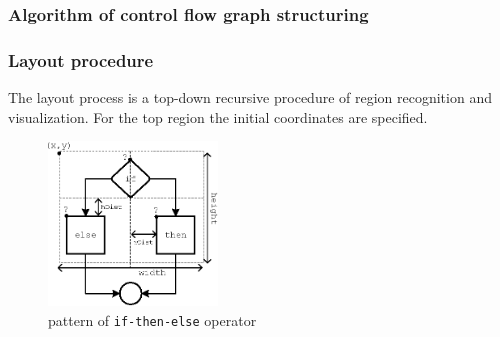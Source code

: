 \documentclass{beamer}
\begin{document}

\begin{frame}
\frametitle{Algorithm of control flow graph structuring}
\small{%
\begin{algorithm}[H]
\SetAlgoLined %
\end{algorithm}%
}
\end{frame}


\begin{frame}
\frametitle{Layout procedure}

The layout process is a top-down recursive procedure of region recognition and visualization.  For the top region the initial coordinates are specified.

\begin{figure}[htbp]
	\centering
		\includegraphics[width=0.4\textwidth]{Pic/IfThenElse.eps}
	\caption{pattern of \texttt{if-then-else} operator}
	\label{fig:IfThenElse}
\end{figure}

\end{frame}
\end{document}
